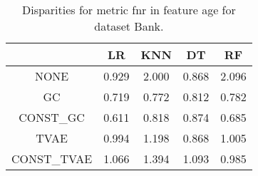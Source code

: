 \begin{table}
\caption{Disparities for metric fnr in feature age for dataset Bank.}
\label{tab:disp-BANK-age-fnr}
\begin{tabular}{ccccc}
\toprule
 & LR & KNN & DT & RF \\
\midrule
NONE & 0.929 & 2.000 & 0.868 & 2.096 \\
GC & 0.719 & 0.772 & 0.812 & 0.782 \\
CONST\_GC & 0.611 & 0.818 & 0.874 & 0.685 \\
TVAE & 0.994 & 1.198 & 0.868 & 1.005 \\
CONST\_TVAE & 1.066 & 1.394 & 1.093 & 0.985 \\
\bottomrule
\end{tabular}
\end{table}
